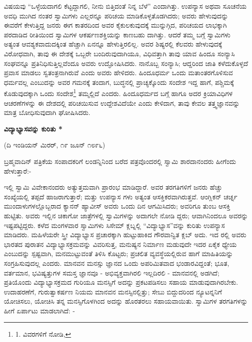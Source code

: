 ವಿಷಯವು “ಒಳ್ಳೆಯದಾಗಲಿ ಕೆಟ್ಟದ್ದಾಗಲಿ, ನೀನು ಬಿತ್ತಿದಂತೆ ನಿನ್ನ ಬೆಳೆ” ಎಂದಾಗಿತ್ತು. ಉಪನ್ಯಾಸ ಅಥವಾ ಸೂಚನೆಯ ಅವಧಿ ಮುಗಿದ ನಂತರ ಸ್ವಾಮಿಗಳು ಎಲ್ಲರನ್ನೂ ಪರಿಚಯ ಮಾಡಿಕೊಳ್ಳತೊಡಗಿದರು; ಅವರು ಹೇಳುವುದನ್ನು ಈವರೆಗೆ ಕೇಳುತ್ತಿದ್ದ ಜನರು ಈಗ ಕಾತರದಿಂದ ಅವರ ಕೈಕುಲಕುವುದಕ್ಕೆ ಮುನ್ನುಗ್ಗಿದ, ಪರಿಚಯದ ಲಾಭಕ್ಕಾಗಿ ಪರದಾಡಿದ ರೀತಿಯಿಂದ ಸ್ವಾಮಿಗಳ ಆಕರ್ಷಣಶಕ್ತಿಯನ್ನು ಕಾಣಬಹು ದಾಗಿತ್ತು. ಆದರೆ ತಮ್ಮ ಬಗ್ಗೆ ಸ್ವಾಮಿಗಳು ಅತ್ಯಂತ ಆವಶ್ಯಕವಾದುದಕ್ಕಿಂತ ಹೆಚ್ಚಾಗಿ ಏನನ್ನೂ ಹೇಳುತ್ತಿರಲಿಲ್ಲ. ಅವರ ಶಿಷ್ಯರಲ್ಲಿ ಕೆಲವರು ಹೇಳುವುದಕ್ಕೆ ವಿರೋಧವಾಗಿ, ತಾವು ಈ ದೇಶಕ್ಕೆ ಒಬ್ಬರೇ ಬಂದಿರುವುದಾಗಿಯೂ, ವಿಧಿವತ್ತಾಗಿ ತಾವು ಯಾವ ಹಿಂದೂ ಸಂನ್ಯಾಸಿ ಸಂಘವನ್ನೂ ಪ್ರತಿನಿಧಿಸುತ್ತಿಲ್ಲವೆಂದೂ ಅವರು ಉದ್ಘೋಷಿಸಿದರು. ನಾನೊಬ್ಬ ಸಂನ್ಯಾಸಿ; ಆದ್ದರಿಂದ ಜಾತಿ ಕಳೆದುಕೊಳ್ಳದೆ ಪ್ರವಾಸ ಮಾಡಲು ಸ್ವತಂತ್ರನಾಗಿರುವೆ ಎಂದು ಅವರು ಹೇಳಿದರು. ಹಿಂದೂಧರ್ಮ ಒಂದು ಮತಾಂತರಗೊಳಿಸುವ ಧರ್ಮವಲ್ಲ ಎಂಬುದನ್ನು ಅವರ ಗಮನಕ್ಕೆ ತಂದಾಗ, ಬುದ್ಧನಲ್ಲಿ ಪ್ರಾಚ್ಯಕ್ಕೊಂದು ಸಂದೇಶ ಇದ್ದ ಹಾಗೆ, ಪಶ್ಚಿಮಕ್ಕೆ ಕೊಡುವುದಕ್ಕಾಗಿ ಒಂದು ಸಂದೇಶ\footnote{1. ವಿವರಗಳಿಗೆ ನೋಡಿ, } ತಮ್ಮಲ್ಲಿದೆ ಎಂದರು. ಹಿಂದೂಧರ್ಮದ ಬಗ್ಗೆ ಹಾಗೂ ಅದರ ಕ್ರಿಯಾವಿಧಿಗಳ ಆಚರಣೆಗಳನ್ನು ಈ ದೇಶದಲ್ಲಿ ಪರಿಚಯಿಸುವ ಉದ್ದೇಶವಿದೆಯೇ ಎಂದು ಕೇಳಿದಾಗ, ತಾವು ಕೇವಲ ತತ್ತ್ವಜ್ಞಾನವನ್ನು ಮಾತ್ರ ಬೋಧಿಸುವುದಾಗಿ ಘೋಷಿಸಿದರು.

\begin{center}
\textbf{ವಿದ್ಯಾಭ್ಯಾಸವನ್ನು ಕುರಿತು *}
\end{center}

\begin{center}
(ದಿ ಇಂಡಿಯನ್ ಮಿರರ್, ೧೯ ಜೂನ್ ೧೮೯೬)
\end{center}

ಬ್ರಹ್ಮವಾದಿನ್ ಪತ್ರಿಕೆಯ ಸಂಪಾದಕರಿಗೆ ಲಂಡನ್ನಿನಿಂದ ಬರೆದ ಪತ್ರವೊಂದರಲ್ಲಿ ಸ್ವಾಮಿ ಶಾರದಾನಂದರು ಹೀಗೆಂದು ಹೇಳುತ್ತಾರೆ:-

ಇಲ್ಲಿ ಸ್ವಾಮಿ ವಿವೇಕಾನಂದರು ಅತ್ಯುತ್ತಮವಾಗಿ ಪ್ರಾರಂಭ ಮಾಡಿದ್ದಾರೆ. ಅವರ ತರಗತಿಗಳಿಗೆ ಜನರು ಹೆಚ್ಚು ಸಂಖ್ಯೆಯಲ್ಲಿ ತಪ್ಪದೆ ಹಾಜರಾಗುತ್ತಾರೆ; ಮತ್ತು ಉಪನ್ಯಾಸ ಗಳು ಅತ್ಯಂತ ಆಸಕ್ತಿಕರವಾಗಿರುತ್ತವೆ. ಆಂಗ್ಲಿಕನ್ ಚರ್ಚ್ನ ಮುಂದಾಳುಗಳಲ್ಲೊಬ್ಬರಾದ ಕ್ಯಾನನ್ ಹ್ಯಾವೀಸ್ ಅವರು ಒಂದು ದಿನ ಆಗಮಿಸಿದರು; ಅವರಿಗೂ ತುಂಬ ಆಸಕ್ತಿ ಹುಟ್ಟಿತು. ಅವರು ಇಲ್ಲಿನ ಚಿಕಾಗೋ ಜಾತ್ರೆಗಳಲ್ಲಿ ಸ್ವಾಮಿಗಳನ್ನು ಅದಾಗಲೇ ನೋಡಿ ದ್ದರು; ಆವಾಗಿನಿಂದಲೂ ಅವರನ್ನು ಇಷ್ಟಪಟ್ಟಿದ್ದರು. ಕಳೆದ ಮಂಗಳವಾರ ಸ್ವಾಮಿಗಳು ಸಿಸೇಮ್​ ಕ್ಲಬ್ನಲ್ಲಿ “ವಿದ್ಯಾಭ್ಯಾಸ”ವನ್ನು ಕುರಿತು ಉಪನ್ಯಾಸ ಮಾಡಿದರು. ಮಹಿಳೆಯರೇ ಸ್ತ್ರೀ ವಿದ್ಯಾಭ್ಯಾಸ ಪ್ರಚಾರಕ್ಕಾಗಿ ಹುಟ್ಟುಹಾಕಿದ ಗೌರವಾನ್ವಿತ ಕ್ಲಬ್ ಅದು. ಇದ ರಲ್ಲಿ ಅವರು ಭಾರತದ ಪುರಾತನ ವಿದ್ಯಾಭ್ಯಾಸಕ್ರಮವನ್ನು ವಿವರಿಸುತ್ತ, ಮನುಷ್ಯನ ನಿರ್ಮಾಣ ಮಡುವುದೇ ಇದರ ಏಕೈಕ ಧ್ಯೇಯ ಎಂಬುದನ್ನು ಸ್ಪಷ್ಟವಾಗಿ, ಮನಮುಟ್ಟುವಂತೆ ತಿಳಿಸಿ ಕೊಟ್ಟರು; ಪ್ರಚಲಿತ ವ್ಯವಸ್ಥೆಯಲ್ಲಿರುವ ಹಾಗೆ ಮಾಹಿತಿಯನ್ನು ಸಂಗ್ರಹಿಸುವುದಲ್ಲ ಎಂದರು. ಮಾನವನ ಮನಸ್ಸು ಜ್ಞಾನದ ಒಂದು ಅಪರಿಮಿತವಾದ ಭಂಡಾರವಿದ್ದಂತೆ; ಭೂತ, ವರ್ತಮಾನ, ಭವಿಷ್ಯತ್ತುಗಳ ಸಮಸ್ತ ಜ್ಞಾನವೂ - ಅಭಿವ್ಯಕ್ತವಾಗಿರಲಿ ಇಲ್ಲದಿರಲಿ - ಮಾನವನಲ್ಲಿ ಅಡಗಿದೆ; ಪ್ರತಿಯೊಂದು ವಿದ್ಯಾಭ್ಯಾಸಕ್ರಮದ ಗುರಿಯೂ ಮನಸ್ಸಿಗೆ ಅದನ್ನು ಪ್ರಕಟಪಡಿಸಲು ಸಹಾಯ ಮಾಡುವುದಾಗಿರಬೇಕು. ಉದಾಹರಣೆಗೆ, ಗುರುತ್ವಾಕರ್ಷಣ ನಿಯಮ ಮಾನವನ ಮನಸ್ಸಿನಲ್ಲಿತ್ತು; ಸೇಬು ಬಿದ್ದುದರಿಂದ ನ್ಯೂಟನ್ನನಿಗೆ ಯೋಚಿಸಲು, ಯೋಚಿಸಿ ತನ್ನ ಮನಸ್ಸಿಗೊಳಗಿಂದ ಅದನ್ನು ಹೊರತರಲು ಸಹಾಯವಾಯಿತು. ಸ್ವಾಮಿಗಳ ತರಗತಿಗಳನ್ನು ಹೀಗೆ ಏರ್ಪಾಟು ಮಾಡಲಾಗಿದೆ: -

